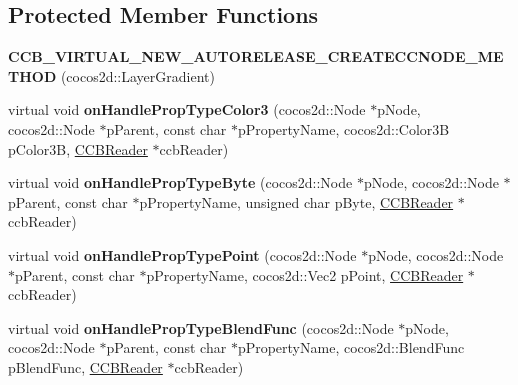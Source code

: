 \subsection*{Protected Member Functions}
\begin{DoxyCompactItemize}
\item 
\mbox{\label{classcocosbuilder_1_1LayerGradientLoader_a0e295637251157b4c7ae748bb1b38b42}} 
{\bfseries C\+C\+B\+\_\+\+V\+I\+R\+T\+U\+A\+L\+\_\+\+N\+E\+W\+\_\+\+A\+U\+T\+O\+R\+E\+L\+E\+A\+S\+E\+\_\+\+C\+R\+E\+A\+T\+E\+C\+C\+N\+O\+D\+E\+\_\+\+M\+E\+T\+H\+OD} (cocos2d\+::\+Layer\+Gradient)
\item 
\mbox{\label{classcocosbuilder_1_1LayerGradientLoader_ad32ff639524f393e322e0f96cb14a595}} 
virtual void {\bfseries on\+Handle\+Prop\+Type\+Color3} (cocos2d\+::\+Node $\ast$p\+Node, cocos2d\+::\+Node $\ast$p\+Parent, const char $\ast$p\+Property\+Name, cocos2d\+::\+Color3B p\+Color3B, \hyperlink{classcocosbuilder_1_1CCBReader}{C\+C\+B\+Reader} $\ast$ccb\+Reader)
\item 
\mbox{\label{classcocosbuilder_1_1LayerGradientLoader_ac1733a8749c608c9c503758987430ee9}} 
virtual void {\bfseries on\+Handle\+Prop\+Type\+Byte} (cocos2d\+::\+Node $\ast$p\+Node, cocos2d\+::\+Node $\ast$p\+Parent, const char $\ast$p\+Property\+Name, unsigned char p\+Byte, \hyperlink{classcocosbuilder_1_1CCBReader}{C\+C\+B\+Reader} $\ast$ccb\+Reader)
\item 
\mbox{\label{classcocosbuilder_1_1LayerGradientLoader_a32cba4ccaa5f7dff9e0d05b8bbcd6db6}} 
virtual void {\bfseries on\+Handle\+Prop\+Type\+Point} (cocos2d\+::\+Node $\ast$p\+Node, cocos2d\+::\+Node $\ast$p\+Parent, const char $\ast$p\+Property\+Name, cocos2d\+::\+Vec2 p\+Point, \hyperlink{classcocosbuilder_1_1CCBReader}{C\+C\+B\+Reader} $\ast$ccb\+Reader)
\item 
\mbox{\label{classcocosbuilder_1_1LayerGradientLoader_a24fe2926f7e595b5c54e6ab5cf38a3f8}} 
virtual void {\bfseries on\+Handle\+Prop\+Type\+Blend\+Func} (cocos2d\+::\+Node $\ast$p\+Node, cocos2d\+::\+Node $\ast$p\+Parent, const char $\ast$p\+Property\+Name, cocos2d\+::\+Blend\+Func p\+Blend\+Func, \hyperlink{classcocosbuilder_1_1CCBReader}{C\+C\+B\+Reader} $\ast$ccb\+Reader)

\end{DoxyCompactItemize}
